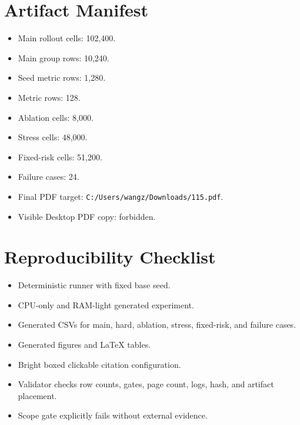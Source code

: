 \documentclass{article}
\begin{document}
\section{Artifact Manifest}
\begin{itemize}
\item Main rollout cells: 102,400.
\item Main group rows: 10,240.
\item Seed metric rows: 1,280.
\item Metric rows: 128.
\item Ablation cells: 8,000.
\item Stress cells: 48,000.
\item Fixed-risk cells: 51,200.
\item Failure cases: 24.
\item Final PDF target: \texttt{C:/Users/wangz/Downloads/115.pdf}.
\item Visible Desktop PDF copy: forbidden.
\end{itemize}
\section{Reproducibility Checklist}
\begin{itemize}
\item Deterministic runner with fixed base seed.
\item CPU-only and RAM-light generated experiment.
\item Generated CSVs for main, hard, ablation, stress, fixed-risk, and failure cases.
\item Generated figures and LaTeX tables.
\item Bright boxed clickable citation configuration.
\item Validator checks row counts, gates, page count, logs, hash, and artifact placement.
\item Scope gate explicitly fails without external evidence.
\end{itemize}
\begingroup
\raggedright


\endgroup
\end{document}
